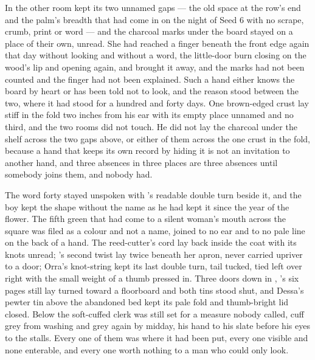 In the other room  kept its two unnamed gaps --- the old space at the row's end and the palm's breadth that had come in on the night of Seed 6 with no scrape, crumb, print or word --- and the charcoal marks under the board stayed on a place of their own, unread. She had reached a finger beneath the front edge again that day without looking and without a word, the little-door burn closing on the wood's lip and opening again, and brought it away, and the marks had not been counted and the finger had not been explained. Such a hand either knows the board by heart or has been told not to look, and the reason stood between the two, where it had stood for a hundred and forty days. One brown-edged crust lay stiff in the fold two inches from his ear with its empty place unnamed and no third, and the two rooms did not touch. He did not lay the charcoal under the shelf across the two gaps above, or either of them across the one crust in the fold, because a hand that keeps its own record by hiding it is not an invitation to another hand, and three absences in three places are three absences until somebody joins them, and nobody had.

The word forty stayed unspoken with 's readable double turn beside it, and the boy kept the shape without the name as he had kept it since the year of the flower. The fifth green that had come to a silent woman's mouth across the square was filed as a colour and not a name, joined to no ear and to no pale line on the back of a hand. The reed-cutter's cord lay back inside the coat with its knots unread; 's second twist lay twice beneath her apron, never carried upriver to a door; Orra's knot-string kept its last double turn, tail tucked, tied left over right with the small weight of a thumb pressed in. Three doors down in , 's six pages still lay turned toward a floorboard and both tins stood shut, and Dessa's pewter tin above the abandoned bed kept its pale fold and thumb-bright lid closed. Below  the soft-cuffed clerk was still set for a measure nobody called, cuff grey from washing and grey again by midday, his hand to his slate before his eyes to the stalls. Every one of them was where it had been put, every one visible and none enterable, and every one worth nothing to a man who could only look.

